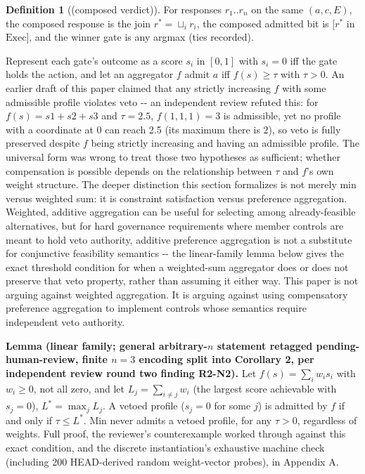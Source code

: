 \documentclass[11pt,a4paper]{article}
\theoremstyle{definition}
\newtheorem{definition}{Definition}
\begin{document}
\begin{definition}[(composed verdict)]
For responses $r_1..r_n$ on the same $(a, c, E)$, the composed response is the join $r^* = \sqcup_i r_i$, the composed admitted bit is $[r^*$ in $\mathrm{Exec}]$, and the winner gate is any argmax (ties recorded).
\end{definition}

Represent each gate's outcome as a score $s_i$ in $[0,1]$ with $s_i = 0$ iff the gate holds the action, and let an aggregator $f$ admit $a$ iff $f(s) \geq \tau$ with $\tau > 0$. An earlier draft of this paper claimed that any strictly increasing $f$ with some admissible profile violates veto -{}- an independent review refuted this: for $f(s) = s1+s2+s3$ and $\tau = 2.5$, $f(1,1,1) = 3$ is admissible, yet no profile with a coordinate at 0 can reach 2.5 (its maximum there is 2), so veto is fully preserved despite $f$ being strictly increasing and having an admissible profile. The universal form was wrong to treat those two hypotheses as sufficient; whether compensation is possible depends on the relationship between $\tau$ and $f$'s own weight structure. The deeper distinction this section formalizes is not merely min versus weighted sum: it is constraint satisfaction versus preference aggregation. Weighted, additive aggregation can be useful for selecting among already-feasible alternatives, but for hard governance requirements where member controls are meant to hold veto authority, additive preference aggregation is not a substitute for conjunctive feasibility semantics -{}- the linear-family lemma below gives the exact threshold condition for when a weighted-sum aggregator does or does not preserve that veto property, rather than assuming it either way. This paper is not arguing against weighted aggregation. It is arguing against using compensatory preference aggregation to implement controls whose semantics require independent veto authority.

\noindent\textbf{Lemma (linear family; general arbitrary-$n$ statement retagged pending-human-review, finite $n=3$ encoding split into Corollary 2, per independent review round two finding R2-N2).} Let $f(s) = \sum_i w_i s_i$ with $w_i \geq 0$, not all zero, and let $L_j = \sum_{i \neq j} w_i$ (the largest score achievable with $s_j = 0$), $L^* = \max_j L_j$. A vetoed profile ($s_j = 0$ for some $j$) is admitted by $f$ if and only if $\tau \leq L^*$. Min never admits a vetoed profile, for any $\tau > 0$, regardless of weights. Full proof, the reviewer's counterexample worked through against this exact condition, and the discrete instantiation's exhaustive machine check (including 200 HEAD-derived random weight-vector probes), in Appendix A.
\end{document}
